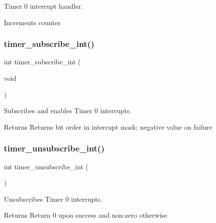 Timer 0 interrupt handler. 

Increments counter \mbox{\label{group___timer_ga4c5d9f47323eda494cfd826f6d62eec9}} 
\subsubsection{\texorpdfstring{timer\+\_\+subscribe\+\_\+int()}{timer\_subscribe\_int()}}
{\footnotesize\ttfamily int timer\+\_\+subscribe\+\_\+int (\begin{DoxyParamCaption}\item[{void}]{ }\end{DoxyParamCaption})}



Subscribes and enables Timer 0 interrupts. 

\begin{DoxyReturn}{Returns}
Returns bit order in interrupt mask; negative value on failure 
\end{DoxyReturn}
\mbox{\label{group___timer_gab9eea51549744bca5c5c923b388bb4ee}} 
\subsubsection{\texorpdfstring{timer\+\_\+unsubscribe\+\_\+int()}{timer\_unsubscribe\_int()}}
{\footnotesize\ttfamily int timer\+\_\+unsubscribe\+\_\+int (\begin{DoxyParamCaption}{ }\end{DoxyParamCaption})}



Unsubscribes Timer 0 interrupts. 

\begin{DoxyReturn}{Returns}
Return 0 upon success and non-\/zero otherwise 
\end{DoxyReturn}
